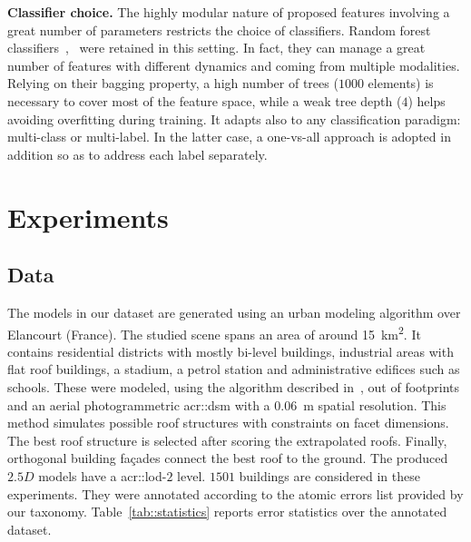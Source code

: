 \documentclass[runningheads]{llncs}
\begin{document}
\noindent
\textbf{Classifier choice.} The highly modular nature of proposed features involving a great number of parameters restricts the choice of classifiers. Random forest classifiers~\cite{breiman2001random},~\cite{criminisi2013decision} were retained in this setting. In fact, they can manage a great number of features with different dynamics and coming from multiple modalities. Relying on their bagging property, a high number of trees ($1000$ elements) is necessary to cover most of the feature space, while a weak tree depth ($4$) helps avoiding overfitting during training. It adapts also to any classification paradigm: multi-class or multi-label. In the latter case, a one-vs-all approach is adopted in addition so as to address each label separately.
\section{Experiments}
\subsection{Data}

The models in our dataset are generated using an urban modeling algorithm over Elancourt (France). The studied scene spans an area of around \SI{15}{\km\squared}. It contains residential districts with mostly bi-level buildings, industrial areas with flat roof buildings, a stadium, a petrol station and administrative edifices such as schools. These were modeled, using the algorithm described in~\cite{Durupt2006}, out of footprints and an aerial photogrammetric \acrshort{acr::dsm} with a \SI{0.06}{\m} spatial resolution. This method simulates possible roof structures with constraints on facet dimensions. The best roof structure is selected after scoring the extrapolated roofs. Finally, orthogonal building fa\c{c}ades connect the best roof to the ground. The produced $2.5D$ models have a \acrshort{acr::lod}-$2$ level.  $1501$ buildings are considered in these experiments. They were annotated according to the atomic errors list provided by our taxonomy. Table~\ref{tab::statistics} reports error statistics over the annotated dataset.
\end{document}
